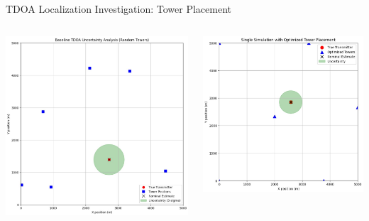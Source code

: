 \begin{frame}{TDOA Localization Investigation: Tower Placement}
    \begin{columns}
        \begin{column}{0.48\textwidth}
            \centering
            \includegraphics[width=\textwidth,keepaspectratio]{images/rtt/random_towers.jpg}
        \end{column}
        \begin{column}{0.48\textwidth}
            \centering
            \includegraphics[width=\textwidth,keepaspectratio]{images/rtt/optimal_towers.jpg}

\end{column}
\end{columns}
\end{frame}

